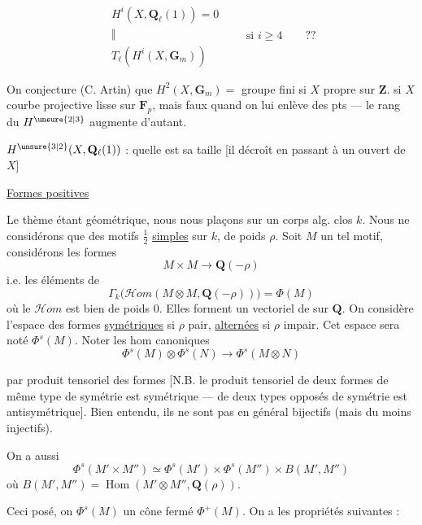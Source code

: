 \[
\begin{array}{c}
H^i(X,\mathbf Q_\ell(1))=0\\
\Vert\\
T_\ell(H^i(X,\mathbf G_m))
\end{array}
\qquad\text{si }i\ge4\qquad ??
\]

On conjecture (C. Artin) que $H^2(X,\mathbf G_m)=$ groupe
fini si $X$ propre sur $\mathbf Z$. 
si $X$ courbe projective lisse sur $\mathbf F_p$, mais
faux quand on lui enlève des pts --- le
rang du $H^{\unsure{2|3}}$ augmente d'autant.

$H^{\unsure{3|2}}(X,\mathbf Q_\ell(1))$ : quelle est sa taille [il décroît en
passant à un ouvert de $X$]

\uline{Formes positives}

Le thème étant géométrique, nous nous plaçons
sur un corps alg. clos $k$. Nous ne
considérons que des motifs $\frac12$ \uline{simples}
sur $k$,  de poids $\rho$. Soit $M$ un tel
motif, considérons les formes
\[
M\times M\longrightarrow\mathbf Q(-\rho)
\]
i.e. les éléments de
\[
\Gamma_k\bigl(\mathcal Hom(M\otimes M,\mathbf Q(-\rho))\bigr)=\Phi(M)
\]
où le  $\mathcal Hom$ est bien de poids $0$.
Elles forment un vectoriel de 
sur $\mathbf Q$. On considère l'espace des
formes \uline{symétriques} si
$\rho$ pair, \uline{alternées} si $\rho$ impair. Cet
espace sera noté $\Phi^s(M)$. Noter les
hom canoniques
\[
\Phi^s(M)\otimes\Phi^s(N)\longrightarrow\Phi^s(M\otimes N)
\]

par produit tensoriel des formes
[N.B. le produit tensoriel de deux formes
 de même type de symétrie
est symétrique --- de deux types opposés
de symétrie est antisymétrique]. Bien
entendu, ils ne sont pas en général
bijectifs (mais du moins injectifs).

On a aussi
\[
\Phi^s(M'\times M'')\simeq\Phi^s(M')\times\Phi^s(M'')\times B(M',M'')
\]
où $B(M',M'')=\operatorname{Hom}(M'\otimes M'',\mathbf Q(\rho))$.

Ceci posé, on 
$\Phi^s(M)$ un cône  fermé $\Phi^+(M)$.
On a les propriétés suivantes :

